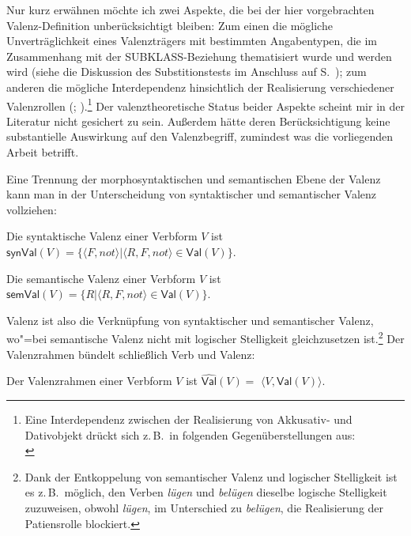 Nur kurz erwähnen möchte ich zwei Aspekte, die bei der hier vorgebrachten Valenz-Defini\-tion unberücksichtigt bleiben: Zum einen die mögliche Unverträglichkeit eines Valenzträgers mit bestimmten Angabentypen, die im Zusammenhang mit der SUBKLASS-Bezie\-hung thematisiert wurde und werden wird (siehe die Diskussion des Substitionstests im Anschluss auf S.~\pageref{par-subsitutionstest}); zum anderen die mögliche Interdependenz hinsichtlich der Realisierung verschiedener Valenzrollen (\citealt[306ff]{Jacobs:94a}; \citealt[397f]{Jacobs:03}).\footnote{Eine Interdependenz zwischen der Realisierung von Akkusativ- und Dativobjekt drückt sich z.\,B.\ in folgenden Gegenüberstellungen aus:\\
} Der valenztheoretische Status beider Aspekte scheint mir in der Literatur nicht gesichert zu sein. Au\ss erdem hätte deren Berücksichtigung keine substantielle Auswirkung auf den Valenzbegriff, zumindest was die vorliegenden Arbeit betrifft.     

Eine Trennung der morphosyntaktischen und semantischen Ebene der Valenz kann man in der Unterscheidung von syntaktischer und semantischer Valenz vollziehen:  
\begin{definition}
Die syntaktische Valenz einer Verbform $V$ ist \linebreak $\mathsf{synVal}(V) = \{\langle F,not \rangle | \langle R,F,not \rangle \in \mathsf{Val}(V) \}$.
\end{definition}
\begin{definition}
Die semantische Valenz einer Verbform $V$ ist \linebreak $\mathsf{semVal}(V) = \{R | \langle R,F,not \rangle \in \mathsf{Val}(V) \}$.
\end{definition}
Valenz ist also die Verknüpfung von syntaktischer und semantischer Valenz, wo"=\newpage \noindent bei semantische Valenz nicht mit logischer Stelligkeit gleichzusetzen ist.\footnote{Dank der Entkoppelung von semantischer Valenz und logischer Stelligkeit ist es z.\,B.\ möglich, den Verben {\it lügen} und {\it belügen} dieselbe logische Stelligkeit zuzuweisen, obwohl {\it lügen}, im Unterschied zu {\it belügen}, die Realisierung der Patiensrolle blockiert.}  Der Valenzrahmen bündelt schlie\ss lich Verb und Valenz:
\begin{definition}[Valenzrahmen]
Der Valenzrahmen einer Verbform $V$ ist $\widehat{\mathsf{Val}}(V) =$ $\langle V, \mathsf{Val}(V) \rangle$.
\end{definition}


